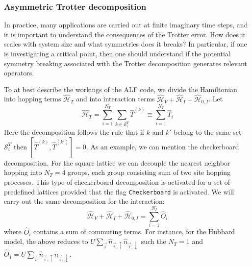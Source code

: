 \subsubsection{ Asymmetric  Trotter decomposition }
In practice, many applications are carried out at finite  imaginary time steps,  and it is important to  understand the consequences of the Trotter error.   How does it scales with system size and  what  symmetries  does it  breaks?   In particular, if  one is investigating a critical  point, then one should understand  if the potential symmetry breaking  associated  with the Trotter decomposition   generates  relevant operators. 

To at best describe the workings of the ALF  code,  we divide the Hamiltonian into  hopping terms  $\hat{\mathcal{H}}_{T}$  and into interaction terms  
$\hat{\mathcal{H}}_{V} +  \hat{\mathcal{H}}_{I}   +   \hat{\mathcal{H}}_{0,I} $.       Let 
\begin{equation}
	\hat{\mathcal{H}}_{T}     = \sum_{i=1}^{N_T} \sum_{k \in \mathcal{S}^{T}_i} \hat{T}^{(k)}  \equiv \sum_{i=1}^{N_T} \hat{T}_{i} 
\end{equation}
Here the decomposition follows the rule  that if $k$ and $k'$  belong to the same set $\mathcal{S}^{T}_i $ then   $ \left[ \hat{T}^{(k)} , \hat{T}^{(k')} \right] = 0 $.  As an 
example, we can mention the checkerboard decomposition.   For the square lattice we can decouple the nearest neighbor hopping  into $N_T=4$ groups,  each group consisting  sum  of two site hopping processes.    This type of checkerboard decomposition is activated for a set  of predefined lattices provided that the flag 
\texttt{Checkerboard}   is activated.     
We will carry out the same decomposition for the interaction: 
\begin{equation}
	\hat{\mathcal{H}}_{V}  +  \hat{\mathcal{H}}_{I}   +   \hat{\mathcal{H}}_{0,I}   = \sum_{i=1}^{N_I}  \hat{O}_{i}
\end{equation}
where $\hat{O}_{i}$  contains a sum of commuting terms.  For instance, for the Hubbard model,   the  above reduces to 
$U \sum_{\vec{i}}  \hat{n}_{\vec{i},\uparrow } \hat{n}_{\vec{i},\downarrow }  $    such the $N_T = 1$ and   $ \hat{O}_{1} = U \sum_{\vec{i}}  \hat{n}_{\vec{i},\uparrow } \hat{n}_{\vec{i},\downarrow }   $. 

